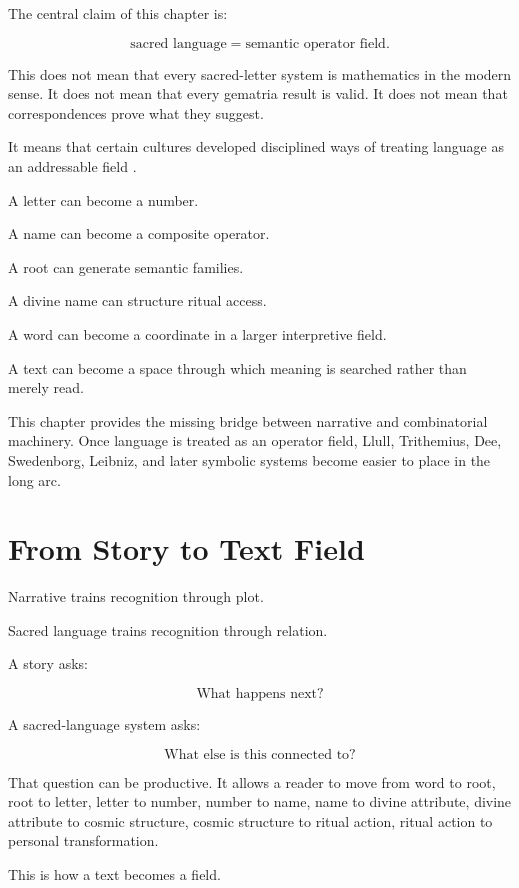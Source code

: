 \documentclass[11pt]{book}
\begin{document}
The central claim of this chapter is:

\[
\text{sacred language} = \text{semantic operator field}.
\]

This does not mean that every sacred-letter system is mathematics in the modern sense. It does not mean that every gematria result is valid. It does not mean that correspondences prove what they suggest.

It means that certain cultures developed disciplined ways of treating language as an addressable field \cite{Eco1995SearchPerfectLanguage,Scholem1974Kabbalah,Idel1988KabbalahNewPerspectives,Yates1966ArtMemory}.

A letter can become a number.

A name can become a composite operator.

A root can generate semantic families.

A divine name can structure ritual access.

A word can become a coordinate in a larger interpretive field.

A text can become a space through which meaning is searched rather than merely read.

This chapter provides the missing bridge between narrative and combinatorial machinery. Once language is treated as an operator field, Llull, Trithemius, Dee, Swedenborg, Leibniz, and later symbolic systems become easier to place in the long arc.

\section{From Story to Text Field}

Narrative trains recognition through plot.

Sacred language trains recognition through relation.

A story asks:

\[
\text{What happens next?}
\]

A sacred-language system asks:

\[
\text{What else is this connected to?}
\]

That question can be productive. It allows a reader to move from word to root, root to letter, letter to number, number to name, name to divine attribute, divine attribute to cosmic structure, cosmic structure to ritual action, ritual action to personal transformation.

This is how a text becomes a field.
\end{document}
